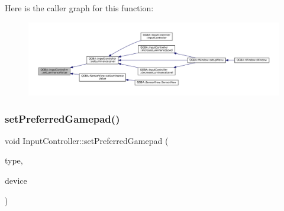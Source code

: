 Here is the caller graph for this function\+:
\nopagebreak
\begin{figure}[H]
\begin{center}
\leavevmode
\includegraphics[width=350pt]{class_q_g_b_a_1_1_input_controller_af4565a7e323e79cc1c75a9d04b8df989_icgraph}
\end{center}
\end{figure}
\mbox{\label{class_q_g_b_a_1_1_input_controller_af97b15453bd2259d7faa448995ae1c1a}} 
\subsubsection{\texorpdfstring{set\+Preferred\+Gamepad()}{setPreferredGamepad()}}
{\footnotesize\ttfamily void Input\+Controller\+::set\+Preferred\+Gamepad (\begin{DoxyParamCaption}\item[{uint32\+\_\+t}]{type,  }\item[{const Q\+String \&}]{device }\end{DoxyParamCaption})}

